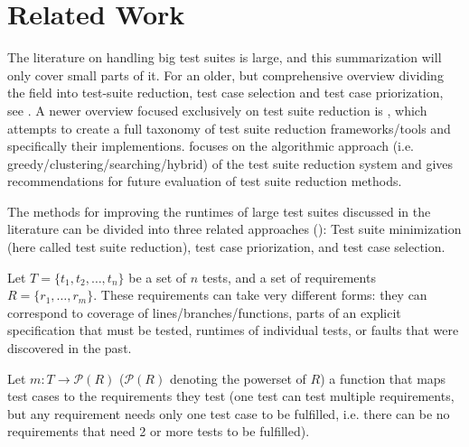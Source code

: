 
\chapter{Related Work}\label{chapter:related}


The literature on handling big test suites is large, and this
summarization will only cover small parts of it. For an older,
but comprehensive overview dividing the field into test-suite
reduction, test case selection and test case priorization, see
\cite{yoo2012regression}. A newer overview focused exclusively on test
suite reduction is \cite{khan2016survey}, which attempts to create a
full taxonomy of test suite reduction frameworks/tools and specifically
their implementions. \cite{khan2018systematic} focuses on the algorithmic
approach (i.e. greedy/clustering/searching/hybrid) of the test suite
reduction system and gives recommendations for future evaluation of test
suite reduction methods.

The methods for improving the runtimes of large test suites discussed
in the literature can be divided into three related approaches
(\cite{yoo2012regression}): Test suite minimization (here called test
suite reduction), test case priorization, and test case selection.



Let $T=\{t_1, t_2, \dots, t_n\}$ be a set of $n$ tests, and a
set of requirements $R=\{r_1, \dots, r_m\}$. These requirements
can take very different forms: they can correspond to coverage of
lines/branches/functions, parts of an explicit specification that must
be tested, runtimes of individual tests, or faults that were discovered
in the past.

Let $m: T \rightarrow \mathcal{P}(R)$ ($\mathcal{P}(R)$ denoting the
powerset of $R$) a function that maps test cases to the requirements they
test (one test can test multiple requirements, but any requirement needs
only one test case to be fulfilled, i.e. there can be no requirements
that need 2 or more tests to be fulfilled).

